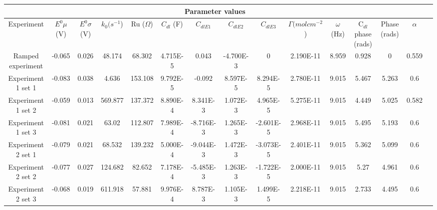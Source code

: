 \documentclass[preview]{standalone}
\begin{document}
\begin{center}
\begin{tabular}{|c|c|c|c|c|c|c|c|c|c|c|c|c|c|c|}
\hline
\multicolumn{14}{|c|}{Parameter values}\\ 
\hline
Experiment & $E^0 \mu$ (V) & $E^0 \sigma$ (V) & $k_0 (s^{-1}$) & Ru ($\Omega$) & $C_{dl}$ (F) & $C_{dlE1}$ & $C_{dlE2}$ & $C_{dlE3}$ & $\Gamma (mol cm^{-2}$) & $\omega$ (Hz) & C$_{dl}$ phase (rads) & Phase (rads) & $\alpha$\\
\hline
Ramped experiment & -0.065 & 0.026 & 48.174 & 68.302 & 4.715E-5 & 0.043 & -4.700E-3 & 0 & 2.190E-11 & 8.959 & 0.928 & 0 & 0.559\\
\hline
Experiment 1 set 1 & -0.083 & 0.038 & 4.636 & 153.108 & 9.792E-5 & -0.092 & 8.597E-5 & 8.294E-5 & 2.780E-11 & 9.015 & 5.467 & 5.263 & 0.6\\
\hline
Experiment 1 set 2 & -0.059 & 0.013 & 569.877 & 137.372 & 8.890E-4 & 8.341E-3 & 1.072E-3 & 4.965E-5 & 5.275E-11 & 9.015 & 4.449 & 5.025 & 0.582\\
\hline
Experiment 1 set 3 & -0.081 & 0.021 & 63.02 & 112.807 & 7.989E-4 & -8.716E-3 & 1.265E-3 & -2.601E-5 & 2.968E-11 & 9.015 & 5.495 & 5.193 & 0.6\\
\hline
Experiment 2 set 1 & -0.079 & 0.021 & 68.532 & 139.232 & 5.000E-4 & -9.044E-3 & 1.472E-3 & -3.073E-5 & 2.401E-11 & 9.015 & 5.362 & 5.099 & 0.6\\
\hline
Experiment 2 set 2 & -0.077 & 0.027 & 124.682 & 82.652 & 7.178E-4 & -5.485E-3 & 1.263E-3 & -1.722E-5 & 2.000E-11 & 9.015 & 5.27 & 4.961 & 0.6\\
\hline
Experiment 2 set 3 & -0.068 & 0.019 & 611.918 & 57.881 & 9.976E-4 & 8.787E-3 & 1.105E-3 & 1.499E-5 & 2.218E-11 & 9.015 & 2.733 & 4.495 & 0.6\\
\hline
\end{tabular}
\end{center}
\end{document}
